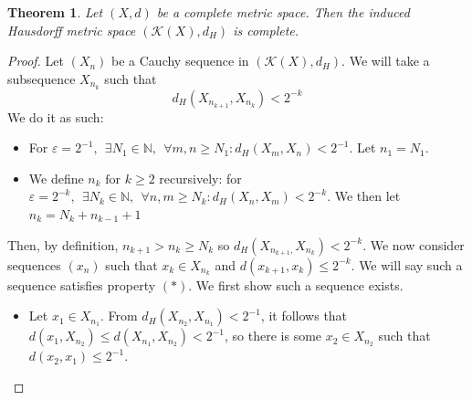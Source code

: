 \documentclass{article}
\theoremstyle{plain}
\newtheorem{thm}{Theorem}[section]
\theoremstyle{definition}
\theoremstyle{remark}
\begin{document}
\begin{thm}
    Let $(X,d)$ be a complete metric space. Then the induced Hausdorff metric space $(\mathcal{K}(X), d_H)$ is complete.
\end{thm}
\begin{proof}
Let $(X_n)$ be a Cauchy sequence in $(\mathcal{K}(X), d_H)$. We will take a subsequence $X_{n_k}$ such that \[d_H(X_{n_{k+1}}, X_{n_k}) < 2^{-k}\]
We do it as such: 
\begin{itemize}
    \item For $\varepsilon = 2^{-1}, \ \  \exists N_1\in \mathbb{N}, \ \  \forall m,n\ge N_1: d_H(X_m, X_n) < 2^{-1}$. Let $n_1=N_1$. 
    \item We define $n_k \text{ for } k\ge 2$ recursively: 
    for $\varepsilon=2^{-k}, \ \  \exists N_k \in \mathbb{N}, \ \ \forall n,m\ge N_k: d_H(X_n, X_m ) <2^{-k} $. We then let $n_k = N_k + n_{k-1}+1$
\end{itemize}
Then, by definition, $n_{k+1}>n_k \ge N_k$ so $d_H(X_{n_{k+1}, }X_{n_k}) < 2^{-k}$. We now consider sequences $(x_n)$ such that $x_k \in X_{n_k}$ and $d(x_{k+1}, x_k)\le 2^{-k}$. We will say such a sequence satisfies property $(*)$. We first show such a sequence exists.

\begin{itemize}
    \item Let $x_1 \in X_{n_1}$. From $d_H(X_{n_{2}}, X_{n_1})<2^{-1}$, it follows that $d(x_1, X_{n_2}) \le d(X_{n_1}, X_{n_2}) < 2^{-1}$, so there is some $x_2 \in X_{n_2}$ such that $d(x_2, x_1) \le 2^{-1}$.


\end{itemize}
\end{proof}
\end{document}
